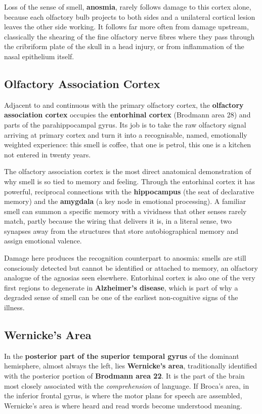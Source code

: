 \documentclass[11pt]{article}
\begin{document}
Loss of the sense of smell, \textbf{anosmia}, rarely follows damage to this cortex alone, because each olfactory bulb projects to both sides and a unilateral cortical lesion leaves the other side working. It follows far more often from damage upstream, classically the shearing of the fine olfactory nerve fibres where they pass through the cribriform plate of the skull in a head injury, or from inflammation of the nasal epithelium itself.

\subsection{Olfactory Association Cortex}

Adjacent to and continuous with the primary olfactory cortex, the \textbf{olfactory association cortex} occupies the \textbf{entorhinal cortex} (Brodmann area 28) and parts of the parahippocampal gyrus. Its job is to take the raw olfactory signal arriving at primary cortex and turn it into a recognisable, named, emotionally weighted experience: this smell is coffee, that one is petrol, this one is a kitchen not entered in twenty years.

The olfactory association cortex is the most direct anatomical demonstration of why smell is so tied to memory and feeling. Through the entorhinal cortex it has powerful, reciprocal connections with the \textbf{hippocampus} (the seat of declarative memory) and the \textbf{amygdala} (a key node in emotional processing). A familiar smell can summon a specific memory with a vividness that other senses rarely match, partly because the wiring that delivers it is, in a literal sense, two synapses away from the structures that store autobiographical memory and assign emotional valence.

Damage here produces the recognition counterpart to anosmia: smells are still consciously detected but cannot be identified or attached to memory, an olfactory analogue of the agnosias seen elsewhere. Entorhinal cortex is also one of the very first regions to degenerate in \textbf{Alzheimer's disease}, which is part of why a degraded sense of smell can be one of the earliest non-cognitive signs of the illness.

\subsection{Wernicke's Area}

In the \textbf{posterior part of the superior temporal gyrus} of the dominant hemisphere, almost always the left, lies \textbf{Wernicke's area}, traditionally identified with the posterior portion of \textbf{Brodmann area 22}. It is the part of the brain most closely associated with the \textit{comprehension} of language. If Broca's area, in the inferior frontal gyrus, is where the motor plans for speech are assembled, Wernicke's area is where heard and read words become understood meaning.
\end{document}
